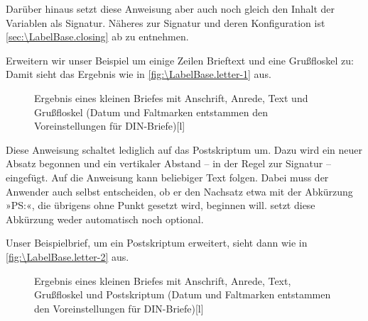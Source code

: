 Darüber hinaus setzt diese Anweisung aber auch noch gleich den Inhalt der
Variablen  als Signatur. Näheres zur
Signatur und deren Konfiguration ist \autoref{sec:\LabelBase.closing} ab
 zu entnehmen.

\begin{Example}
  Erweitern wir unser Beispiel um einige Zeilen Brieftext und eine Grußfloskel
  zu:
  Damit sieht das Ergebnis wie in \autoref{fig:\LabelBase.letter-1} aus.
  \begin{figure}
    \setcapindent{0pt}%
    \begin{captionbeside}{Ergebnis eines kleinen
        Briefes mit Anschrift, Anrede, Text und Grußfloskel (Datum und
        Faltmarken entstammen den Voreinstellungen für DIN-Briefe)}[l]
    \end{captionbeside}
    \label{fig:\LabelBase.letter-1}
  \end{figure}
\end{Example}
%
\EndIndexGroup


\begin{Declaration}
\end{Declaration}%
Diese Anweisung schaltet lediglich auf das
Postskriptum um. Dazu wird ein neuer Absatz
begonnen und ein vertikaler Abstand -- in der Regel zur Signatur --
eingefügt. Auf die Anweisung  kann beliebiger Text folgen.
Dabei muss der Anwender auch selbst entscheiden, ob er den Nachsatz
etwa mit der Abkürzung »PS:«, die übrigens ohne Punkt gesetzt wird,
beginnen will. \KOMAScript{} setzt diese Abkürzung weder
automatisch noch optional.

\begin{Example}
  Unser Beispielbrief, um ein Postskriptum erweitert,
  sieht dann wie in \autoref{fig:\LabelBase.letter-2} aus.
  \begin{figure}
    \setcapindent{0pt}%
    \begin{captionbeside}{Ergebnis eines kleinen
        Briefes mit Anschrift, Anrede, Text, Grußfloskel und Postskriptum
        (Datum und Faltmarken entstammen den Voreinstellungen für
        DIN-Briefe)}[l]
    \end{captionbeside}
    \label{fig:\LabelBase.letter-2}
  \end{figure}
\end{Example}


